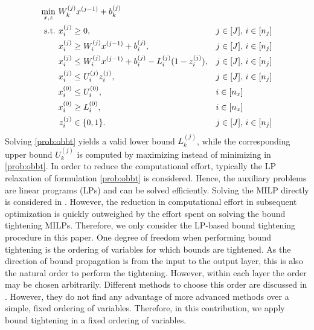 \begin{equation}\label{prob:obbt}
    \begin{aligned}
    \min_{x,z}\ & W^{(j)}_k x^{(j-1)} + b^{(j)}_k \\ 
    \textrm{s.t.}\ & \begin{alignedat}[t]{3}
            x^{(j)}_i & \geq 0, \quad && j \in [J],\, i \in [n_j] \\
            x^{(j)}_i & \geq W^{(j)}_i x^{(j-1)} + b^{(j)}_i, \quad && j \in [J],\, i \in [n_j] \\
            x^{(j)}_i & \leq W^{(j)}_i x^{(j-1)} + b^{(j)}_i - L^{(j)}_i (1-z^{(j)}_i), \quad && j \in [J],\, i \in [n_j] \\
            x^{(j)}_i & \leq U^{(j)}_i z^{(j)}_i, \quad && j \in [J],\, i \in [n_j] \\
            x^{(0)}_i  & \leq U^{(0)}_i,        \quad && i \in [n_x]\\
            x^{(0)}_i  & \geq L^{(0)}_i,        \quad && i \in [n_x]\\
            z^{(j)}_i & \in \{0,1\}. \quad && j \in [J],\, i \in [n_j]
        \end{alignedat}
    \end{aligned}
\end{equation}
Solving \eqref{prob:obbt} yields a valid lower bound $L^{(j)}_k$, while the corresponding upper bound $U^{(j)}_k$ is computed by maximizing instead of minimizing in \eqref{prob:obbt}. In order to reduce the computational effort, typically the LP relaxation of formulation \eqref{prob:obbt} is considered. Hence, the auxiliary problems are linear programs (LPs) and can be solved efficiently. Solving the MILP directly is considered in \citet{Badilla2023,Grimstad2019}. However, the reduction in computational effort in subsequent optimization is quickly outweighed by the effort spent on solving the bound tightening MILPs. Therefore, we only consider the LP-based bound tightening procedure in this paper. One degree of freedom when performing bound tightening is the ordering of variables for which bounds are tightened. As the direction of bound propagation is from the input to the output layer, this is also the natural order to perform the tightening. However, within each layer the order may be chosen arbitrarily. Different methods to choose this order are discussed in \citet{Rossig2021}. However, they do not find any advantage of more advanced methods over a simple, fixed ordering of variables. Therefore, in this contribution, we apply bound tightening in a fixed ordering of variables.%

